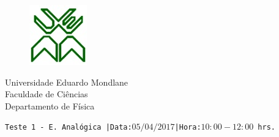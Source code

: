 \documentclass[12pt,a4paper,twoside]{report}
\author{Bartolomeu J. Ubisse}
\begin{document}
\begin{figure}[htb]

\centering
\includegraphics[scale=1]{UEM-logotipo}
\end{figure}
\centering
{ \Large Universidade Eduardo Mondlane}\\[0.3cm] 
\large Faculdade de Ci\^encias\\[0.2cm]
 \large Departamento de F\'isica\\[0.5cm]

\begin{flushleft}
\tt Teste 1 - E. Anal\'ogica\hspace{0.25cm} |Data:$05/04/2017$\hspace{0.25cm}|Hora:$10:00-12:00$ hrs.\\
\hrulefill
\end{flushleft}
\end{document}
